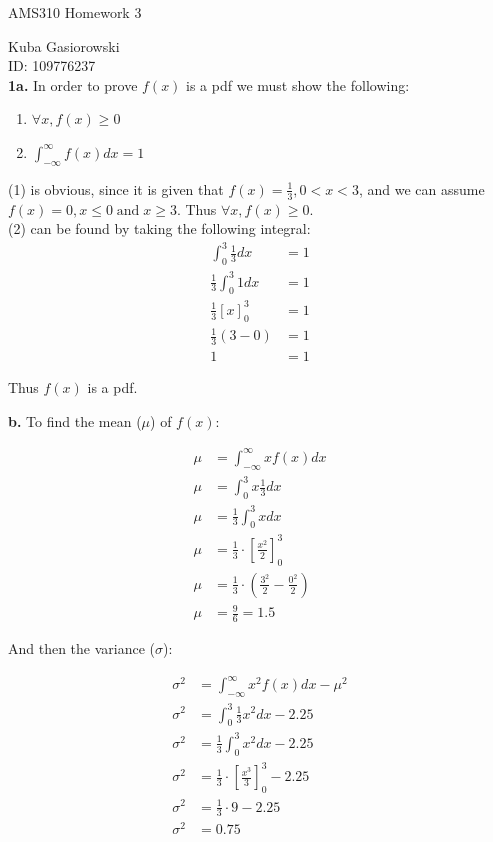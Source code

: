 \documentclass[12pt]{report}
\begin{document}
\Large
\centering
AMS310 Homework 3

\justify
\normalsize

Kuba Gasiorowski\\
ID: 109776237\\

\noindent \textbf{1a.} In order to prove $f(x)$ is a pdf we must show the following:
\begin{enumerate}
	\item $\forall x, f(x) \geq 0$
	\item $\int_{-\infty}^{\infty} f(x)dx = 1$
\end{enumerate}

\noindent (1) is obvious, since it is given that $ f(x) = \frac{1}{3}, 0 < x < 3 $, and we can assume $f(x) = 0, x \leq 0 \;\text{and}\; x \geq 3$. Thus $\forall x, f(x) \geq 0$.\\

\noindent (2) can be found by taking the following integral: 
\begin{align*}
\int_{0}^{3}\frac{1}{3}dx &= 1\\
\frac{1}{3}\int_{0}^{3}1dx &= 1\\
\frac{1}{3}\left[x\right]_0^3 &= 1\\
\frac{1}{3}(3 - 0) &= 1\\
1 &= 1
\end{align*}

\noindent Thus $f(x)$ is a pdf. \\

\pagebreak

\noindent \textbf{b.} To find the mean ($\mu$) of $f(x)$:

\begin{align*}
\mu &= \int_{-\infty}^{\infty} xf(x)dx \\
\mu &= \int_0^3 x\frac{1}{3}dx \\
\mu &= \frac{1}{3}\int_0^3 xdx \\
\mu &= \frac{1}{3} \cdot \left[\frac{x^2}{2}\right]_0^3 \\
\mu &= \frac{1}{3} \cdot \left(\frac{3^2}{2} - \frac{0^2}{2}\right)\\
\mu &= \boxed{\frac{9}{6} = 1.5}
\end{align*}

\noindent And then the variance ($\sigma$):

\begin{align*}
\sigma^2 &= \int_{-\infty}^{\infty} x^2f(x)dx - \mu^2\\
\sigma^2 &= \int_{0}^{3} \frac{1}{3}x^2dx - 2.25\\
\sigma^2 &= \frac{1}{3}\int_{0}^{3}x^2dx - 2.25\\
\sigma^2 &= \frac{1}{3} \cdot \left[ \frac{x^3}{3} \right]_0^3 - 2.25\\
\sigma^2 &= \frac{1}{3} \cdot 9 - 2.25\\
\sigma^2 &= \boxed{0.75}\\
\end{align*}
\end{document}
